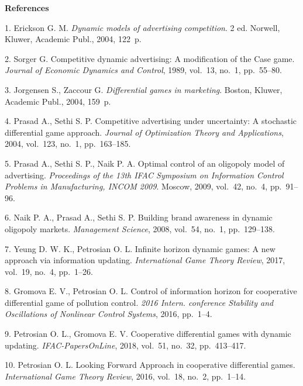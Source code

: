 
{\small

\vskip6mm

\noindent \textbf{References} }

\vskip 2mm

{\footnotesize

1. Erickson G. M. {\it Dynamic models of advertising competition}.
2 ed. Norwell, Kluwer, Academic Publ., 2004, 122~p.

2. Sorger G. Competitive dynamic advertising: A modification of
the Case game. {\it Journal of Economic Dynamics and Control},
1989, vol.~13, no.~1, pp.~55--80.

3. Jorgensen S., Zaccour G. {\it Differential games in marketing}.
Boston, Kluwer, Academic Publ., 2004, 159~p.

4. Prasad A., Sethi S. P. Competitive advertising under
uncertainty: A stochastic differential game approach. {\it Journal
of Optimization Theory and Applications}, 2004, vol.~123, no.~1,
pp.~163--185.

5. Prasad A., Sethi S. P., Naik P. A. Optimal control of an
oligopoly model of advertising. {\it Proceedings of the 13th IFAC
Symposium on Information Control Problems in Manufacturing, INCOM
2009}. Moscow, 2009, vol.~42, no.~4, pp.~91--96.

6. Naik P. A., Prasad A., Sethi S. P. Building brand awareness in
dynamic oligopoly markets. {\it Management Science}, 2008,
vol.~54, no.~1, pp.~129--138.


7. Yeung D. W. K., Petrosian O. L. Infinite horizon dynamic games: %
A new approach via information updating. {\it International Game %
Theory Review}, 2017, vol.~19, no.~4, pp.~1--26.

8. Gromova E. V., Petrosian O. L. Control of information horizon
for cooperative differential game of pollution control. {\it 2016
Intern. conference Stability and Oscillations of Nonlinear Control
Systems}, 2016, pp.~1--4.

9. Petrosian O. L., Gromova E. V. Cooperative differential games
with dynamic updating. {\it IFAC-PapersOnLine}, 2018, vol.~51,
no.~32, pp.~413--417.

10. Petrosian O. L. Looking Forward Approach in cooperative
differential games. {\it International Game Theory Review}, 2016,
vol.~18, no.~2, pp.~1--14.

}
